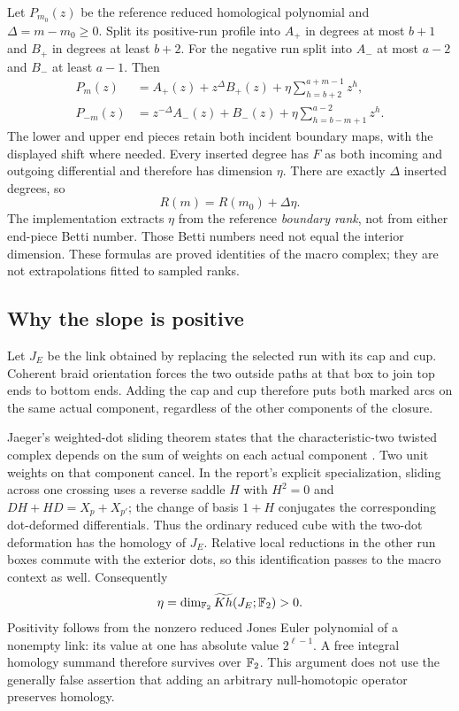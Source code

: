 Let $P_{m_0}(z)$ be the reference reduced homological polynomial and
$\Delta=m-m_0\ge0$. Split its positive-run profile into
$A_+$ in degrees at most $b+1$ and $B_+$ in degrees at least $b+2$.
For the negative run split into $A_-$ at most $a-2$ and $B_-$ at least
$a-1$. Then
\begin{align*}
 P_m(z)&=A_+(z)+z^\Delta B_+(z)
             +\eta\sum_{h=b+2}^{a+m-1}z^h,\\
 P_{-m}(z)&=z^{-\Delta}A_-(z)+B_-(z)
             +\eta\sum_{h=b-m+1}^{a-2}z^h.
\end{align*}
The lower and upper end pieces retain both incident boundary maps, with
the displayed shift where needed. Every inserted degree has $F$ as both
incoming and outgoing differential and therefore has dimension $\eta$.
There are exactly $\Delta$ inserted degrees, so
\[
 R(m)=R(m_0)+\Delta\eta.
\]
The implementation extracts $\eta$ from the reference \emph{boundary rank},
not from either end-piece Betti number. Those Betti numbers need not equal
the interior dimension. These formulas are proved identities of the macro
complex; they are not extrapolations fitted to sampled ranks.

\subsection{Why the slope is positive}
Let $J_E$ be the link obtained by replacing the selected run with its cap
and cup. Coherent braid orientation forces the two outside paths at that
box to join top ends to bottom ends. Adding the cap and cup therefore puts
both marked arcs on the same actual component, regardless of the other
components of the closure.

Jaeger's weighted-dot sliding theorem states that the characteristic-two
twisted complex depends on the sum of weights on each actual component
\cite{jaeger-twisted}. Two unit weights on that component cancel. In the
report's explicit specialization, sliding across one crossing uses a reverse
saddle $H$ with $H^2=0$ and $DH+HD=X_p+X_{p'}$; the change of basis
$1+H$ conjugates the corresponding dot-deformed differentials. Thus the
ordinary reduced cube with the two-dot deformation has the homology of
$J_E$. Relative local reductions in the other run boxes commute with the
exterior dots, so this identification passes to the macro context as well.
Consequently
\[
 \eta=\dim_{\mathbb{F}_2}\widetilde{Kh}(J_E;\mathbb{F}_2)>0.
\]
Positivity follows from the nonzero reduced Jones Euler polynomial of a
nonempty link: its value at one has absolute value $2^{\ell-1}$.
A free integral homology summand therefore survives over $\mathbb{F}_2$.
This argument does not use the generally false assertion that adding an
arbitrary null-homotopic operator preserves homology.

